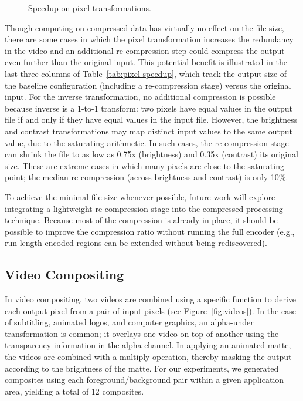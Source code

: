\begin{figure}[t]
\caption{Speedup on pixel transformations.
\protect\label{fig:pixel-speedup}}
\end{figure}

Though computing on compressed data has virtually no effect on the
file size, there are some cases in which the pixel transformation
increases the redundancy in the video and an additional re-compression
step could compress the output even further than the original input.
This potential benefit is illustrated in the last three columns of
Table~\ref{tab:pixel-speedup}, which track the output size of the
baseline configuration (including a re-compression stage) versus the
original input.  For the inverse transformation, no additional
compression is possible because inverse is a 1-to-1 transform: two
pixels have equal values in the output file if and only if they have
equal values in the input file.  However, the brightness and contrast
transformations may map distinct input values to the same output
value, due to the saturating arithmetic.  In such cases, the
re-compression stage can shrink the file to as low as 0.75x
(brightness) and 0.35x (contrast) its original size.  These are
extreme cases in which many pixels are close to the saturating point;
the median re-compression (across brightness and contrast) is only
10\%.

To achieve the minimal file size whenever possible, future work will
explore integrating a lightweight re-compression stage into the
compressed processing technique.  Because most of the compression is
already in place, it should be possible to improve the compression
ratio without running the full encoder (e.g., run-length encoded
regions can be extended without being rediscovered).  

%

\subsection{Video Compositing}

In video compositing, two videos are combined using a specific
function to derive each output pixel from a pair of input pixels (see
Figure~\ref{fig:videos}).  In the case of subtitling, animated logos,
and computer graphics, an alpha-under transformation is common; it
overlays one video on top of another using the transparency
information in the alpha channel.  In applying an animated matte, the
videos are combined with a multiply operation, thereby masking the
output according to the brightness of the matte.  For our experiments,
we generated composites using each foreground/background pair within a
given application area, yielding a total of 12 composites.

